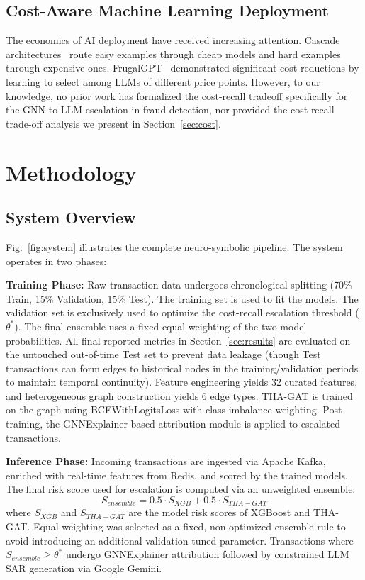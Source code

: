 \documentclass[journal]{IEEEtran}
\begin{document}
\subsection{Cost-Aware Machine Learning Deployment}

The economics of AI deployment have received increasing attention. Cascade architectures~\cite{wang2023wisdom} route easy examples through cheap models and hard examples through expensive ones. FrugalGPT~\cite{chen2023frugalgpt} demonstrated significant cost reductions by learning to select among LLMs of different price points. However, to our knowledge, no prior work has formalized the cost-recall tradeoff specifically for the GNN-to-LLM escalation in fraud detection, nor provided the cost-recall trade-off analysis we present in Section~\ref{sec:cost}.

\section{Methodology}

\subsection{System Overview}

Fig.~\ref{fig:system} illustrates the complete neuro-symbolic pipeline. The system operates in two phases:

\textbf{Training Phase:} Raw transaction data undergoes chronological splitting (70\% Train, 15\% Validation, 15\% Test). The training set is used to fit the models. The validation set is exclusively used to optimize the cost-recall escalation threshold ($\theta^*$). The final ensemble uses a fixed equal weighting of the two model probabilities. All final reported metrics in Section~\ref{sec:results} are evaluated on the untouched out-of-time Test set to prevent data leakage (though Test transactions can form edges to historical nodes in the training/validation periods to maintain temporal continuity). Feature engineering yields 32 curated features, and heterogeneous graph construction yields 6 edge types. THA-GAT is trained on the graph using BCEWithLogitsLoss with class-imbalance weighting. Post-training, the GNNExplainer-based attribution module is applied to escalated transactions.

\textbf{Inference Phase:} Incoming transactions are ingested via Apache Kafka, enriched with real-time features from Redis, and scored by the trained models. The final risk score used for escalation is computed via an unweighted ensemble:
\begin{equation}
S_{ensemble} = 0.5 \cdot S_{XGB} + 0.5 \cdot S_{THA-GAT}
\end{equation}
where $S_{XGB}$ and $S_{THA-GAT}$ are the model risk scores of XGBoost and THA-GAT. Equal weighting was selected as a fixed, non-optimized ensemble rule to avoid introducing an additional validation-tuned parameter. Transactions where $S_{ensemble} \ge \theta^*$ undergo GNNExplainer attribution followed by constrained LLM SAR generation via Google Gemini.
\end{document}
